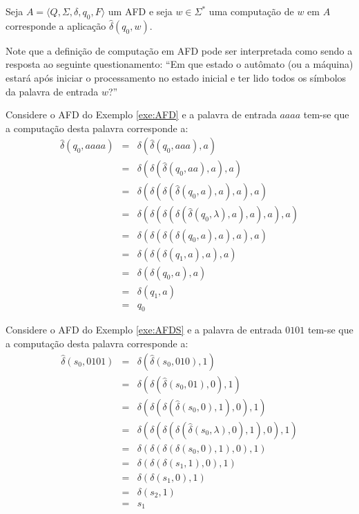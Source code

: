 \begin{definition}\label{def:ComputacaoAFD}
	Seja $A = \langle Q, \Sigma, \delta, q_0, F\rangle$ um AFD e seja $w \in \Sigma^*$ uma computação de $w$ em $A$ corresponde a aplicação $\widehat{\delta}(q_0, w)$.
\end{definition}

Note que a definição de computação em AFD pode ser interpretada como sendo a resposta ao seguinte questionamento: ``Em que estado o autômato (ou a máquina) estará após iniciar o processamento no estado inicial e ter lido todos os símbolos da palavra de entrada $w$?''

\begin{example}\label{exe:ComputacaoAFD1}
	Considere o AFD do Exemplo \ref{exe:AFD} e a palavra de entrada $aaaa$ tem-se que a computação desta palavra corresponde a:
	\begin{eqnarray*}
		\widehat{\delta}(q_0, aaaa) & = & \delta(\widehat{\delta}(q_0, aaa), a)\\
		& = & \delta(\delta(\widehat{\delta}(q_0, aa), a), a)\\
		& = & \delta(\delta(\delta(\widehat{\delta}(q_0, a), a), a), a)\\
		& = & \delta(\delta(\delta(\delta(\widehat{\delta}(q_0, \lambda), a), a), a), a)\\
		& = & \delta(\delta(\delta(\delta(q_0, a), a), a), a)\\
		& = & \delta(\delta(\delta(q_1, a), a), a)\\
		& = & \delta(\delta(q_0, a), a)\\
		& = & \delta(q_1, a)\\
		& = & q_0
	\end{eqnarray*}
\end{example}

\begin{example}\label{exe:ComputacaoAFD2}
	Considere o AFD do Exemplo \ref{exe:AFDS} e a palavra de entrada $0101$ tem-se que a computação desta palavra corresponde a:
	\begin{eqnarray*}
		\widehat{\delta}(s_0, 0101) & = & \delta(\widehat{\delta}(s_0, 010), 1)\\
		& = & \delta(\delta(\widehat{\delta}(s_0, 01), 0), 1)\\
		& = & \delta(\delta(\delta(\widehat{\delta}(s_0, 0), 1), 0), 1)\\
		& = & \delta(\delta(\delta(\delta(\widehat{\delta}(s_0, \lambda), 0), 1), 0), 1)\\
		& = & \delta(\delta(\delta(\delta(s_0, 0), 1), 0), 1)\\
		& = & \delta(\delta(\delta(s_1, 1), 0), 1)\\
		& = & \delta(\delta(s_1, 0), 1)\\
		& = & \delta(s_2, 1)\\
		& = & s_1
	\end{eqnarray*}
\end{example}

